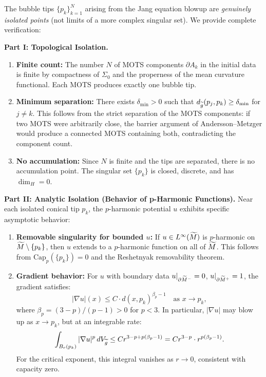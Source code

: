 \begin{proposition}\label{prop:BubbleTipIsolation}
The bubble tips $\{p_k\}_{k=1}^N$ arising from the Jang equation blowup are \emph{genuinely isolated points} (not limits of a more complex singular set). We provide complete verification:

\textbf{Part I: Topological Isolation.}
\begin{enumerate}
    \item \textbf{Finite count:} The number $N$ of MOTS components $\partial A_k$ in the initial data is finite by compactness of $\Sigma_0$ and the properness of the mean curvature functional. Each MOTS produces exactly one bubble tip.
    
    \item \textbf{Minimum separation:} There exists $\delta_{\min} > 0$ such that $d_{\widetilde{g}}(p_j, p_k) \ge \delta_{\min}$ for $j \neq k$. This follows from the strict separation of the MOTS components: if two MOTS were arbitrarily close, the barrier argument of Andersson--Metzger would produce a connected MOTS containing both, contradicting the component count.
    
    \item \textbf{No accumulation:} Since $N$ is finite and the tips are separated, there is no accumulation point. The singular set $\{p_k\}$ is closed, discrete, and has $\dim_H = 0$.
\end{enumerate}

\textbf{Part II: Analytic Isolation (Behavior of p-Harmonic Functions).}
Near each isolated conical tip $p_k$, the $p$-harmonic potential $u$ exhibits specific asymptotic behavior:

\begin{enumerate}
    \item \textbf{Removable singularity for bounded $u$:} If $u \in L^\infty(\widetilde{M})$ is $p$-harmonic on $\widetilde{M} \setminus \{p_k\}$, then $u$ extends to a $p$-harmonic function on all of $\widetilde{M}$. This follows from $\text{Cap}_p(\{p_k\}) = 0$ and the Reshetnyak removability theorem.
    
    \item \textbf{Gradient behavior:} For $u$ with boundary data $u|_{\partial \widetilde{M}^-} = 0$, $u|_{\partial \widetilde{M}^+} = 1$, the gradient satisfies:
    \begin{equation}
        |\nabla u|(x) \le C \cdot d(x, p_k)^{\beta_p - 1} \quad \text{as } x \to p_k,
    \end{equation}
    where $\beta_p = (3-p)/(p-1) > 0$ for $p < 3$. In particular, $|\nabla u|$ may blow up as $x \to p_k$, but at an integrable rate:
    \begin{equation}
        \int_{B_r(p_k)} |\nabla u|^p \, dV_{\widetilde{g}} \le C r^{3 - p + p(\beta_p - 1)} = C r^{3-p} \cdot r^{p(\beta_p - 1)}.
    \end{equation}
    For the critical exponent, this integral vanishes as $r \to 0$, consistent with capacity zero.
    

\end{enumerate}
\end{proposition}
